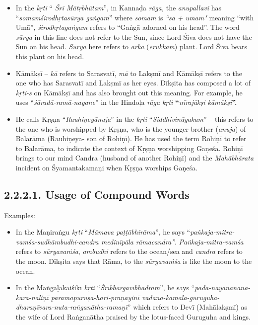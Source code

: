 \begin{itemize}
\item In the \textit{kṛti} “ \textit{Śrī Mātṛbhūtam}”, in Kannaḍa \textit{rāga,} the \textit{anupallavi} has “\textit{somamśirodhṛtasūrya gaṅgam}” where \textit{somam} is \textit{“sa + umam"} meaning “with Umā”, \textit{ śirodhṛtagaṅgam} refers to “Gaṅgā adorned on his head”. The word \textit{sūrya} in this line does not refer to the Sun, since Lord Śiva does not have the Sun on his head. \textit{Sūrya} here refers to \textit{arka} (\textit{erukkam}) plant. Lord Śiva bears this plant on his head.

 \item Kāmākṣī – \textit{kā} refers to Sarasvatī, \textit{mā} to Lakṣmī and Kāmākṣī refers to the one who has Sarasvatī and Lakṣmī as her eyes. Dīkṣita has composed a lot of \textit{kṛti-s} on Kāmākṣī and has also brought out this meaning. For example, he uses “\textit{śāradā-ramā-nayane}” in the Hindoḷa\textit{ rāga kṛti} \textbf{“}\textit{nīrajākṣi kāmākṣī}\textbf{”.}

 \item He calls Kṛṣṇa “\textit{Rauhiṇeyānuja}” in the \textit{kṛti} “\textit{Siddhivināyakam}” – this refers to the one who is worshipped by Kṛṣṇa, who is the younger brother (\textit{anuja}) of Balarāma (Rauhiṇeya- son of Rohiṇī). He has used the term Rohiṇī to refer to Balarāma, to indicate the context of Kṛṣṇa worshipping Gaṇeśa. Rohiṇī brings to our mind Candra (husband of another Rohiṇī) and the \textit{Mahābhārata} incident on Śyamantakamaṇi when Kṛṣṇa worships Gaṇeśa.

\end{itemize}


\subsection*{2.2.2.1. Usage of Compound Words}

Examples:

\begin{itemize}
\item In the Maṇiraṅgu \textit{kṛti} “\textit{Māmava paṭṭābhirāma}”, he says “\textit{paṅkaja-mitra-vamśa-sudhāmbudhi-candra medinīpāla rāmacandra”}. \textit{Paṅkaja-mitra-vamśa} refers to \textit{sūryavaṁśa}, \textit{ambudhi} refers to the ocean/sea and \textit{ candra} refers to the moon. Dīkṣita says that Rāma, to the \textit{sūryavaṁśa} is like the moon to the ocean.

 \item In the Maṅgaḷakaiśikī \textit{kṛti} “\textit{Śrībhārgavībhadram}”, he says “\textit{pada-nayanānana-kara-naliṇī paramapuruṣa-hari-praṇayinī vadana-kamala-guruguha-dharaṇīvara-nuta-raṅganātha-ramaṇī}” which refers to Devī (Mahālakṣmī) as the wife of Lord Raṅganātha praised by the lotus-faced Guruguha and kings.

\end{itemize}


